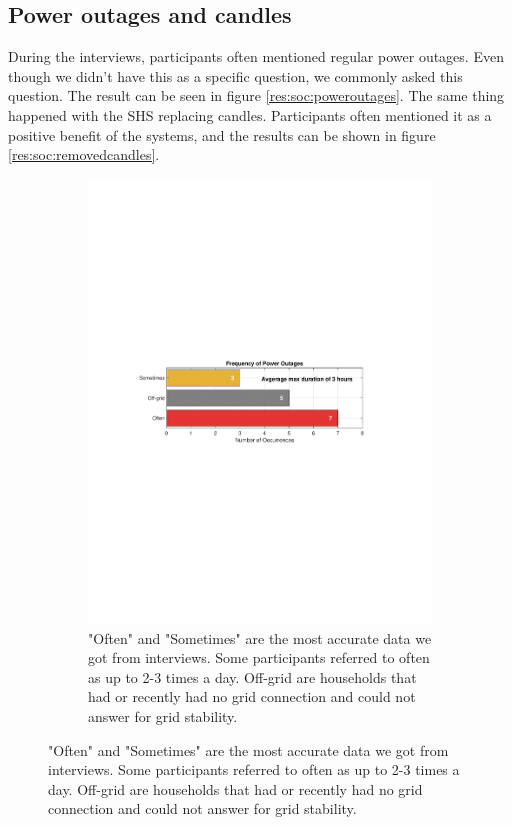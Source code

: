 \subsection{Power outages and candles}
During the interviews, participants often mentioned regular power outages. Even though we didn't have this as a specific question, we commonly asked this question. The result can be seen in figure \ref{res:soc:poweroutages}. The same thing happened with the SHS replacing candles. Participants often mentioned it as a positive benefit of the systems, and the results can be shown in figure \ref{res:soc:removedcandles}. 

\begin{figure}[H]
    \centering
    \begin{subfigure}[t]{0.48\textwidth}
        \centering
        \includegraphics[width=\textwidth]{photos/PowerOutagesFrequency.pdf}
        \caption{"Often" and "Sometimes" are the most accurate data we got from interviews. Some participants referred to often as up to 2-3 times a day. Off-grid are households that had or recently had no grid connection and could not answer for grid stability.}

\end{subfigure}
\end{figure}
